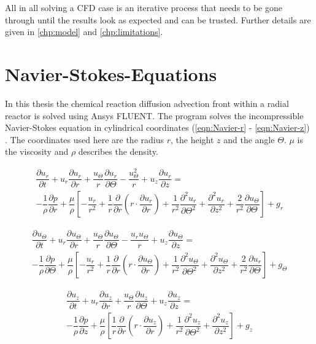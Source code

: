 \documentclass[../thesis.tex]{subfiles}
\begin{document}
All in all solving a CFD case is an iterative process that needs to be gone through until the results look as expected and can be trusted. Further details are given in \autoref{chp:model} and \autoref{chp:limitations}.

\section{Navier-Stokes-Equations}

In this thesis the chemical reaction diffusion advection front within a radial reactor is solved using Ansys FLUENT. The program solves the incompressible Navier-Stokes equation in cylindrical coordinates (\autoref{eqn:Navier-r} - \autoref{eqn:Navier-z}) \cite{vitturi2016navier}. The coordinates used here are the radius $r$, the height $z$ and the angle $\Theta$. $\mu$ is the viscosity and $\rho$ describes the density.

\begin{gather}
	\label{eqn:Navier-r}
	 \dfrac{\partial u_r}{\partial t} + u_r \dfrac{\partial u_r}{\partial r} + \dfrac{u_\Theta}{ r} \dfrac{\partial u_r}{\partial \Theta} - \dfrac{u_\Theta^2}{r} + u_z \dfrac{\partial u_r}{\partial z} = \\ \nonumber
	-\dfrac{1}{\rho} \dfrac{\partial p}{\partial r} + \dfrac{\mu}{\rho} \left[
		- \dfrac{u_r}{r^2} + \dfrac{1}{r} \dfrac{\partial}{\partial r} \left( r \cdot \dfrac{\partial u_r}{\partial r} \right) +
		\dfrac{1}{r^2} \dfrac{\partial^2 u_r}{\partial \Theta^2} + \dfrac{\partial^2 u_r}{\partial z^2} + \dfrac{2}{r^2} \dfrac{\partial u_\Theta}{\partial \Theta}
	\right] + g_r
\end{gather}

\begin{gather}
	\label{eqn:Navier-Theta}
	\dfrac{\partial u_\Theta}{\partial t} + u_r \dfrac{\partial u_\Theta}{\partial r} + \dfrac{u_\Theta}{ r} \dfrac{\partial u_\Theta}{\partial \Theta} - \dfrac{u_r u_\Theta}{r} + u_z \dfrac{\partial u_\Theta}{\partial z} = \\ \nonumber
	-\dfrac{1}{\rho} \dfrac{\partial p}{\partial \Theta} + \dfrac{\mu}{\rho} \left[
	- \dfrac{u_r}{r^2} + \dfrac{1}{r} \dfrac{\partial}{\partial r} \left( r \cdot \dfrac{\partial u_\Theta}{\partial r} \right) +
	\dfrac{1}{r^2} \dfrac{\partial^2 u_\Theta}{\partial \Theta^2} + \dfrac{\partial^2 u_\Theta}{\partial z^2} + \dfrac{2}{r^2} \dfrac{\partial u_r}{\partial \Theta}
	\right] + g_\Theta
\end{gather}


\begin{gather}
	\label{eqn:Navier-z}
	\dfrac{\partial u_z}{\partial t} + u_r \dfrac{\partial u_z}{\partial r} + \dfrac{u_\Theta}{ r} \dfrac{\partial u_z}{\partial \Theta} + u_z \dfrac{\partial u_z}{\partial z} = \\ \nonumber
	-\dfrac{1}{\rho} \dfrac{\partial p}{\partial z} + \dfrac{\mu}{\rho} \left[
	\dfrac{1}{r} \dfrac{\partial}{\partial r} \left( r \cdot \dfrac{\partial u_z}{\partial r} \right) +
	\dfrac{1}{r^2} \dfrac{\partial^2 u_z}{\partial \Theta^2} + \dfrac{\partial^2 u_z}{\partial z^2}
	\right] + g_z
\end{gather}
\end{document}
